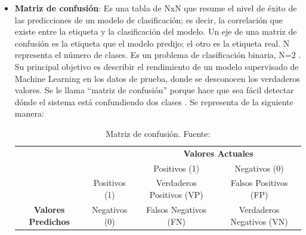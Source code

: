 \begin{itemize}
	\item \textbf{Matriz de confusión}: Es una tabla de NxN que resume el nivel de éxito de las predicciones de un modelo de clasificación; es decir, la correlación que existe entre la etiqueta y la clasificación del modelo. Un eje de una matriz de confusión es la etiqueta que el modelo predijo; el otro es la etiqueta real. N representa el número de clases. Es un problema de clasificación binaria, N=2 \parencite{gl_kohavi1998ml_glossary}. Su principal objetivo es describir el rendimiento de un modelo supervisado de Machine Learning en los datos de prueba, donde se desconocen los verdaderos valores. Se le llama “matriz de confusión” porque hace que sea fácil detectar dónde el sistema está confundiendo dos clases \parencite{gl_bigdata2019metricas}. Se representa de la siguiente manera:
	
	\begin{table}[h!]
		\centering
		\small
		\begin{tabular}{llcc}
			&                                                            & \multicolumn{2}{c}{\textbf{Valores Actuales}}                                                      \\ \cline{3-4} 
			& \multicolumn{1}{l|}{}                                      & \multicolumn{1}{c|}{\cellcolor[HTML]{DAEEF3}Positivos (1)} & \multicolumn{1}{c|}{\cellcolor[HTML]{DAEEF3}Negativos (0)} \\ \cline{2-4} 
			\multicolumn{1}{c|}{}                                             & \multicolumn{1}{c|}{\cellcolor[HTML]{DAEEF3}Positivos (1)} & \multicolumn{1}{c|}{Verdaderos Positivos (VP)}             & \multicolumn{1}{c|}{Falsos Positivos (FP)}                 \\ \cline{2-4} 
			\multicolumn{1}{c|}{\multirow{-2}{*}{\textbf{Valores Predichos}}} & \multicolumn{1}{c|}{\cellcolor[HTML]{DAEEF3}Negativos (0)} & \multicolumn{1}{c|}{Falsos Negativos (FN)}                 & \multicolumn{1}{c|}{Verdaderos Negativos (VN)}             \\ \cline{2-4} 
		\end{tabular}
		\caption{Matriz de confusión. Fuente: \cite{gl_izco2018bdc}}
		\label{3:table2}
	\end{table}
	
\end{itemize}

